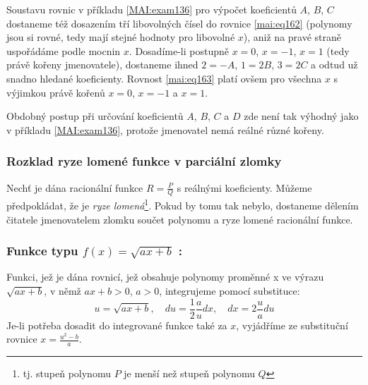       Soustavu rovnic v příkladu \ref{MAI:exam136} pro výpočet koeficientů \(A\), \(B\), \(C\)
      dostaneme též dosazením tří libovolných čísel do rovnice \ref{mai:eq162} (polynomy jsou si
      rovné, tedy mají stejné hodnoty pro libovolné \(x\)), aniž na pravé straně uspořádáme podle
      mocnin \(x\). Dosadíme-li postupně \(x=0\), \(x=-1\), \(x=1\) (tedy právě kořeny jmenovatele),
      dostaneme ihned \(2=-A\), \(1=2B\), \(3=2C\) a odtud už snadno hledané koeficienty. Rovnost
      \ref{mai:eq163} platí ovšem pro všechna \(x\) s výjimkou právě kořenů  \(x=0\), \(x=-1\) a
      \(x=1\).

      

      Obdobný postup při určování koeficientů \(A\), \(B\), \(C\) a \(D\) zde není tak výhodný jako
      v příkladu \ref{MAI:exam136}, protože jmenovatel nemá reálné různé kořeny. 

      
    \subsubsection{Rozklad ryze lomené funkce v parciální zlomky}
    Nechť je dána racionální funkce $R = \frac{P}{Q}$ s reálnými koeficienty. Můžeme
    předpokládat, že je \emph{ryze lomená}\footnote{tj. stupeň polynomu $P$ je menší než
    stupeň polynomu $Q$}. Pokud by tomu tak nebylo, dostaneme dělením čitatele jmenovatelem
    zlomku součet polynomu a ryze lomené racionální funkce.

    

    
    
    
      
    \subsubsection*{Funkce typu $\boxed{f(x)=\sqrt{ax+b}}$ :}
      Funkci, jež je dána rovnicí, jež obsahuje polynomy proměnné x  ve výrazu $\sqrt{ax+b}$,
      v němž $ax+b>0$, $a>0$, integrujeme pomocí substituce:
      \begin{equation}\label{ma:eq_sub_fce1}
          u=\sqrt{ax+b},\quad du=\frac{1}{2}\frac{a}{u}dx,\quad dx=2\frac{u}{a}du
      \end{equation}
      Je-li potřeba dosadit do integrované funkce také za $x$, vyjádříme ze substituční
      rovnice $x=\frac{u^2-b}{a}$.

